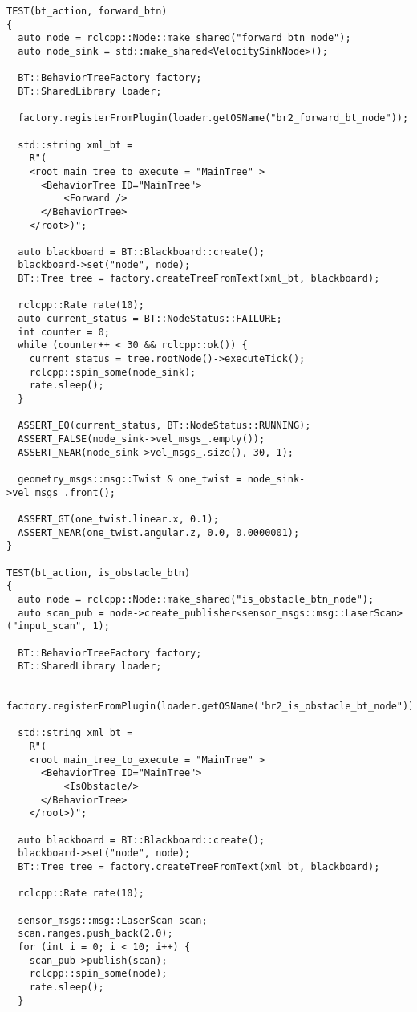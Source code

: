\begin{tcolorbox}[sharp corners, colframe=gray!80, colback=LightGray, left=0pt, top=0pt, bottom=0pt, title=\texttt{br2\_bt\_bumpgo/tests/bt\_action\_test.cpp}]
\begin{verbatim}
TEST(bt_action, forward_btn)
{
  auto node = rclcpp::Node::make_shared("forward_btn_node");
  auto node_sink = std::make_shared<VelocitySinkNode>();

  BT::BehaviorTreeFactory factory;
  BT::SharedLibrary loader;

  factory.registerFromPlugin(loader.getOSName("br2_forward_bt_node"));

  std::string xml_bt =
    R"(
    <root main_tree_to_execute = "MainTree" >
      <BehaviorTree ID="MainTree">
          <Forward />
      </BehaviorTree>
    </root>)";

  auto blackboard = BT::Blackboard::create();
  blackboard->set("node", node);
  BT::Tree tree = factory.createTreeFromText(xml_bt, blackboard);

  rclcpp::Rate rate(10);
  auto current_status = BT::NodeStatus::FAILURE;
  int counter = 0;
  while (counter++ < 30 && rclcpp::ok()) {
    current_status = tree.rootNode()->executeTick();
    rclcpp::spin_some(node_sink);
    rate.sleep();
  }

  ASSERT_EQ(current_status, BT::NodeStatus::RUNNING);
  ASSERT_FALSE(node_sink->vel_msgs_.empty());
  ASSERT_NEAR(node_sink->vel_msgs_.size(), 30, 1);

  geometry_msgs::msg::Twist & one_twist = node_sink->vel_msgs_.front();

  ASSERT_GT(one_twist.linear.x, 0.1);
  ASSERT_NEAR(one_twist.angular.z, 0.0, 0.0000001);
}

TEST(bt_action, is_obstacle_btn)
{
  auto node = rclcpp::Node::make_shared("is_obstacle_btn_node");
  auto scan_pub = node->create_publisher<sensor_msgs::msg::LaserScan>("input_scan", 1);

  BT::BehaviorTreeFactory factory;
  BT::SharedLibrary loader;

  factory.registerFromPlugin(loader.getOSName("br2_is_obstacle_bt_node"));

  std::string xml_bt =
    R"(
    <root main_tree_to_execute = "MainTree" >
      <BehaviorTree ID="MainTree">
          <IsObstacle/>
      </BehaviorTree>
    </root>)";

  auto blackboard = BT::Blackboard::create();
  blackboard->set("node", node);
  BT::Tree tree = factory.createTreeFromText(xml_bt, blackboard);

  rclcpp::Rate rate(10);

  sensor_msgs::msg::LaserScan scan;
  scan.ranges.push_back(2.0);
  for (int i = 0; i < 10; i++) {
    scan_pub->publish(scan);
    rclcpp::spin_some(node);
    rate.sleep();
  }


\end{verbatim}
\end{tcolorbox}
